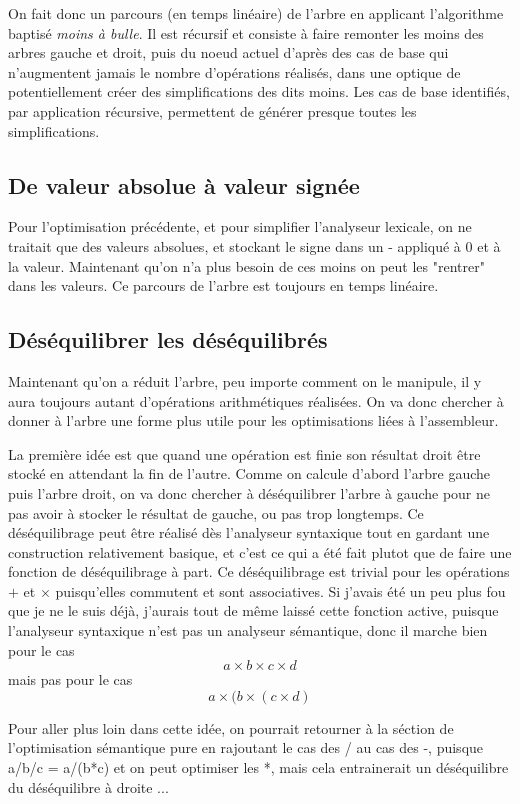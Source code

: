 \documentclass{article}
\begin{document}
On fait donc un parcours (en temps linéaire) de l'arbre en applicant l'algorithme baptisé \emph{moins à bulle}. Il est récursif et consiste à faire remonter les moins des arbres gauche et droit, puis du noeud actuel d'après des cas de base qui n'augmentent jamais le nombre d'opérations réalisés, dans une optique de potentiellement créer des simplifications des dits moins. Les cas de base identifiés, par application récursive, permettent de générer presque toutes les simplifications.

\subsection{De valeur absolue à valeur signée}
Pour l'optimisation précédente, et pour simplifier l'analyseur lexicale, on ne traitait que des valeurs absolues, et stockant le signe dans un - appliqué à 0 et à la valeur. Maintenant qu'on n'a plus besoin de ces moins on peut les "rentrer" dans les valeurs. Ce parcours de l'arbre est toujours en temps linéaire.

\subsection{Déséquilibrer les déséquilibrés}
Maintenant qu'on a réduit l'arbre, peu importe comment on le manipule, il y aura toujours autant d'opérations arithmétiques réalisées. On va donc chercher à donner à l'arbre une forme plus utile pour les optimisations liées à l'assembleur.

La première idée est que quand une opération est finie son résultat droit être stocké en attendant la fin de l'autre. Comme on calcule d'abord l'arbre gauche puis l'arbre droit, on va donc chercher à déséquilibrer l'arbre à gauche pour ne pas avoir à stocker le résultat de gauche, ou pas trop longtemps. Ce déséquilibrage peut être réalisé dès l'analyseur syntaxique tout en gardant une construction relativement basique, et c'est ce qui a été fait plutot que de faire une fonction de déséquilibrage à part. Ce déséquilibrage est trivial pour les opérations $+$ et $\times$ puisqu'elles commutent et sont associatives. Si j'avais été un peu plus fou que je ne le suis déjà, j'aurais tout de même laissé cette fonction active, puisque l'analyseur syntaxique n'est pas un analyseur sémantique, donc il marche bien pour le cas \[ a \times b \times c \times d \] mais pas pour le cas \[ a \times (b \times (c \times d) \]

Pour aller plus loin dans cette idée, on pourrait retourner à la séction de l'optimisation sémantique pure en rajoutant le cas des / au cas des -, puisque a/b/c = a/(b*c) et on peut optimiser les *, mais cela entrainerait un déséquilibre du déséquilibre à droite ...
\end{document}
